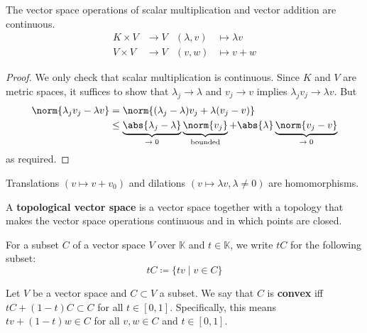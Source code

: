 \documentclass{article}
\newcommand{\K}{\mathbb{K}}
\begin{document}
\begin{fact}
    The vector space operations of scalar multiplication and vector addition are continuous.
    \begin{align}
        K \times V &\to V & (\lambda, v) &\mapsto \lambda v \\
        V \times V &\to V & (v, w) &\mapsto v + w
    \end{align}
\end{fact}
\begin{proof}
    We only check that scalar multiplication is continuous. Since $K$ and $V$ are metric spaces, it suffices to show that $\lambda_j \to \lambda$ and $v_j \to v$ implies $\lambda_j v_j \to \lambda v$. But
    \begin{align*}
        \norm{\lambda_j v_j - \lambda v} &= \norm{(\lambda_j - \lambda) v_j + \lambda(v_j - v)} \\
                                         &\leq \underbrace{\abs{\lambda_j - \lambda}}_\text{$\to 0$} \underbrace{\norm{v_j}}_\text{bounded} + \abs{\lambda} \underbrace{\norm{v_j - v}}_\text{$\to 0$}
    \end{align*}
    as required.
\end{proof}
\begin{cor}
    Translations $(v \mapsto v + v_0)$ and dilations $(v \mapsto \lambda v, \lambda \ne 0)$ are homomorphisms.
\end{cor}

\begin{defi}\label{def:topological_vector_space}
    A \textbf{topological vector space} is a vector space together with a topology that makes the vector space operations continuous and in which points are closed.
\end{defi}

\begin{notation}
    For a subset $C$ of a vector space $V$ over $\K$ and $t \in \K$, we write $t C$ for the following subset:
    \begin{equation*}
        t C \coloneqq \{t v \mid v \in C\}
    \end{equation*}
\end{notation}
\begin{defi}\label{def:convex_subset}
    Let $V$ be a vector space and $C \subset V$ a subset.  We say that $C$ is \textbf{convex} iff $t C + (1-t) C \subset C$ for all $t \in [0, 1]$. Specifically, this means $t v + (1-t) w \in C$ for all $v, w \in C$ and $t \in [0, 1]$.
\end{defi}
\end{document}
